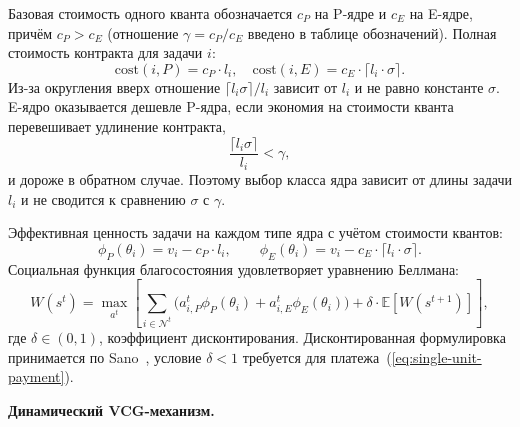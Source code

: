 \documentclass[14pt, oneside]{extbook}
\begin{document}
        Базовая стоимость одного кванта обозначается $c_P$
        на P-ядре и $c_E$ на E-ядре, причём $c_P > c_E$
        (отношение $\gamma = c_P / c_E$ введено в таблице
        обозначений). Полная стоимость контракта
        для задачи $i$:
        \begin{equation*}
                \mathrm{cost}(i, P) = c_P \cdot l_i, \quad
                \mathrm{cost}(i, E) = c_E \cdot \lceil l_i \cdot \sigma \rceil.
        \end{equation*}
        Из-за округления вверх отношение
        $\lceil l_i \sigma \rceil / l_i$ зависит от $l_i$ и не
        равно константе $\sigma$. E-ядро оказывается дешевле
        P-ядра, если экономия на стоимости кванта перевешивает
        удлинение контракта,
        \begin{equation*}
                \frac{\lceil l_i \sigma \rceil}{l_i} < \gamma,
        \end{equation*}
        и дороже в обратном случае. Поэтому выбор класса ядра
        зависит от длины задачи $l_i$ и не сводится к сравнению
        $\sigma$ с $\gamma$.

        Эффективная ценность задачи на каждом типе ядра
        с учётом стоимости квантов:
        \begin{equation}\label{eq:phi}
                \phi_P(\theta_i) = v_i - c_P \cdot l_i, \qquad
                \phi_E(\theta_i) = v_i - c_E \cdot \lceil l_i \cdot
                \sigma \rceil.
        \end{equation}
        Социальная функция благосостояния удовлетворяет
        уравнению Беллмана:
        \begin{equation*}
                W(s^t) = \max_{a^t} \left[
                        \sum_{i \in \mathcal{N}^t} \!\!\bigl(
                                a_{i,P}^t \phi_P(\theta_i) +
                                a_{i,E}^t \phi_E(\theta_i)
                        \bigr) +
                        \delta \cdot \mathbb{E}[W(s^{t+1})]
                \right],
        \end{equation*}
        где $\delta \in (0, 1)$, коэффициент дисконтирования.
        Дисконтированная формулировка принимается по
        Sano~\cite{sano}, условие $\delta < 1$ требуется для
        платежа~(\ref{eq:single-unit-payment}).



\textbf{Динамический VCG-механизм.}
\end{document}
